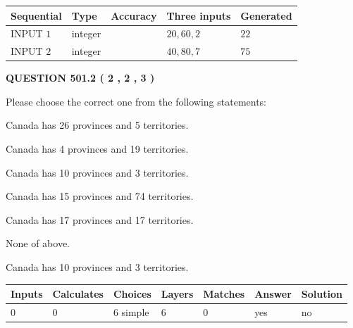 \documentclass[12pt]{article}
\begin{document}
   
  
  
\noindent\begin{tabular}{|l|l|l|l|l|}
\hline
 Sequential & Type & Accuracy & Three inputs & Generated \\ 
\hline
 
 
  INPUT $  1 $ & integer &  & $
 20
 , 
 60
 , 
 2
 $ & $ 22 $ 
 \\  \hline  
 
 
  INPUT $  2 $ & integer &  & $
 40
 , 
 80
 , 
 7
 $ & $ 75 $ 
 \\  \hline  
 \end{tabular}
   
   
  
\vspace{0.2in}
  
{\textbf{\Large{QUESTION
501.2 
 ( 2 , 2 , 3 )
}}}
  
  
Please choose the correct one from the following statements:
 
 
Canada has  26 provinces and  5 territories.
 
 
Canada has   4 provinces and  19 territories.
 
 
Canada has 10  provinces and 3 territories.
 
 
Canada has  15 provinces and  74 territories.
 
 
Canada has  17 provinces and  17 territories.
 
 
 None of above.
 
 
\noindent{}
 
 
Canada has 10  provinces and 3 territories.
 
 
\noindent{}
 
 
   
   
   
   
\noindent\begin{tabular}{|l|l|l|l|l|l|l|}
 \hline
Inputs & Calculates & Choices & Layers & Matches & Answer & Solution \\ \hline
 0  & 
 0  & 
 6
  simple  
  & 
 6  & 
 0  & 
  yes & 
  no 
  \\ \hline
 \end{tabular}
   
\end{document}
